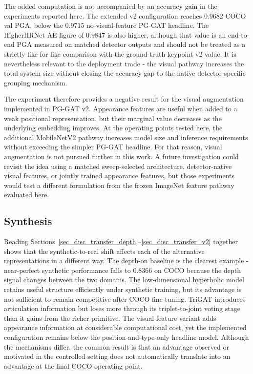 The added computation is not accompanied by an accuracy gain in the
experiments reported here.
The extended v2 configuration reaches $0.9682$ COCO val PGA,
below the $0.9715$ no-visual-feature PG-GAT headline.
The HigherHRNet AE figure of $0.9847$ is also higher,
although that value is an end-to-end PGA measured on matched detector
outputs and should not be treated as a strictly like-for-like comparison
with the ground-truth-keypoint v2 value.
It is nevertheless relevant to the deployment trade -
the visual pathway increases the total system size without closing the
accuracy gap to the native detector-specific grouping mechanism.

The experiment therefore provides a negative result for the visual
augmentation implemented in PG-GAT v2.
Appearance features are useful when added to a weak positional
representation,
but their marginal value decreases as the underlying embedding improves.
At the operating points tested here,
the additional MobileNetV2 pathway increases model size and inference
requirements without exceeding the simpler PG-GAT headline.
For that reason, visual augmentation is not pursued further in this
work.
A future investigation could revisit the idea using a matched
sweep-selected architecture,
detector-native visual features,
or jointly trained appearance features,
but those experiments would test a different formulation from the frozen
ImageNet feature pathway evaluated here.

\subsection{Synthesis}
\label{sec_disc_transfer_synthesis}

Reading Sections~\ref{sec_disc_transfer_depth}--\ref{sec_disc_transfer_v2}
together shows that the synthetic-to-real shift affects each of the
alternative representations in a different way.
The depth-on baseline is the clearest example -
near-perfect synthetic performance falls to $0.8366$ on COCO because
the depth signal changes between the two domains.
The low-dimensional hyperbolic model retains useful structure
efficiently under synthetic training,
but its advantage is not sufficient to remain competitive after COCO
fine-tuning.
TriGAT introduces articulation information but loses more through its
triplet-to-joint voting stage than it gains from the richer primitive.
The visual-feature variant adds appearance information at considerable
computational cost,
yet the implemented configuration remains below the
position-and-type-only headline model.
Although the mechanisms differ, the common result is that an advantage
observed or motivated in the controlled setting does not automatically
translate into an advantage at the final COCO operating point.

